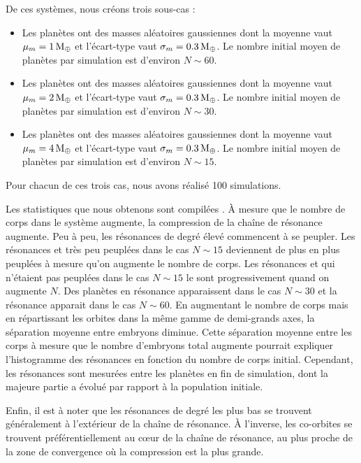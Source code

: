 De ces systèmes, nous créons trois sous-cas :
\begin{itemize}
\item Les planètes ont des masses aléatoires gaussiennes dont la moyenne vaut $\mu_m=1\mathrm{\thinspace M_\oplus}$ et l'écart-type vaut $\sigma_m=0.3\mathrm{\thinspace M_\oplus}$. Le nombre initial moyen de planètes par simulation est d'environ $N\sim 60$.
\item Les planètes ont des masses aléatoires gaussiennes dont la moyenne vaut $\mu_m=2\mathrm{\thinspace M_\oplus}$ et l'écart-type vaut $\sigma_m=0.3\mathrm{\thinspace M_\oplus}$. Le nombre initial moyen de planètes par simulation est d'environ $N\sim 30$.
\item Les planètes ont des masses aléatoires gaussiennes dont la moyenne vaut $\mu_m=4\mathrm{\thinspace M_\oplus}$ et l'écart-type vaut $\sigma_m=0.3\mathrm{\thinspace M_\oplus}$. Le nombre initial moyen de planètes par simulation est d'environ $N\sim 15$.
\end{itemize}

Pour chacun de ces trois cas, nous avons réalisé 100 simulations. 

Les statistiques que nous obtenons sont compilées . À mesure que le nombre de corps dans le système
augmente, la compression de la chaîne de résonance augmente. Peu à peu, les résonances de degré élevé commencent à se peupler.
Les résonances  et  très peu peuplées dans le cas $N\sim 15$ deviennent de plus en plus peuplées à mesure qu'on
augmente le nombre de corps. Les résonances  et  qui n'étaient pas peuplées dans le cas $N\sim 15$ le
sont progressivement quand on augmente $N$. Des planètes en résonance  apparaissent dans le cas $N\sim 30$ et la
résonance  apparait dans le cas $N\sim 60$. En augmentant le nombre de corps mais en répartissant les orbites dans
la même gamme de demi-grands axes, la séparation moyenne entre embryons diminue. Cette séparation moyenne entre les corps à
mesure que le nombre d'embryons total augmente pourrait expliquer l'histogramme des résonances en fonction du nombre de corps
initial. Cependant, 
les résonances sont mesurées entre les planètes en fin de simulation, dont la majeure partie a évolué par rapport à la population initiale. 

Enfin, il est à noter que les résonances de degré les plus bas se trouvent généralement à l'extérieur de la chaîne de résonance. À l'inverse, les co-orbites se trouvent préférentiellement au cœur de la chaîne de résonance, au plus proche de la zone de convergence où la compression est la plus grande. 

